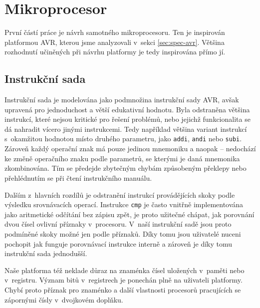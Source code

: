 \chapter{Mikroprocesor}

První částí práce je návrh samotného mikroprocesoru. Ten je inspirován platformou AVR, kterou jsme analyzovali v~sekci \ref{sec:spec-avr}. Většina rozhodnutí u\-či\-ně\-ných při návrhu platformy je tedy inspirována přímo jí.

\section{Instrukční sada}

Instrukční sada je modelována jako podmnožina instrukční sady AVR, avšak upravená pro jednoduchost a větší edukativní hodnotu. Byla odstraněna vět\-ši\-na instrukcí, které nejsou kritické pro řešení problémů, nebo jejichž funkcionalita se dá nahradit vícero jinými instrukcemi. Tedy například většina variant instrukcí s~okamžitou hodnotou místo druhého parametru, jako \texttt{addi}, \texttt{andi} nebo \texttt{subi}. Zároveň každý operační znak má pouze jedinou mnemoniku a naopak -- nedochází ke změně operačního znaku podle parametrů, se kterými je daná mnemonika zkombinována. Tím se předejde zbytečným chybám způsobeným překlepy nebo přehlédnutím se při čtení instrukčního manuálu.

Dalším z~hlavních rozdílů je odstranění instrukcí provádějících skoky podle výsledku srovnávacích operací. Instrukce \texttt{cmp} je často vnitřně implementována jako aritmetické odčítání bez zápisu zpět, je proto užitečné chápat, jak porovnání dvou čísel ovlivní příznaky v~procesoru. V~naší instrukční sadě jsou proto podmíněné skoky možné jen podle příznaků. Díky tomu jsou uživatelé nuceni pochopit jak funguje porovnávací instrukce interně a zároveň je díky tomu instrukční sada jednodušší.

Naše platforma též neklade důraz na znaménka čísel uložených v~paměti nebo v~registru. Význam bitů v~registrech je ponechán plně na uživateli platformy. Chybí proto příznak pro znaménko a další vlastnosti procesorů pracujících se zápornými čísly v~dvojkovém doplňku.

